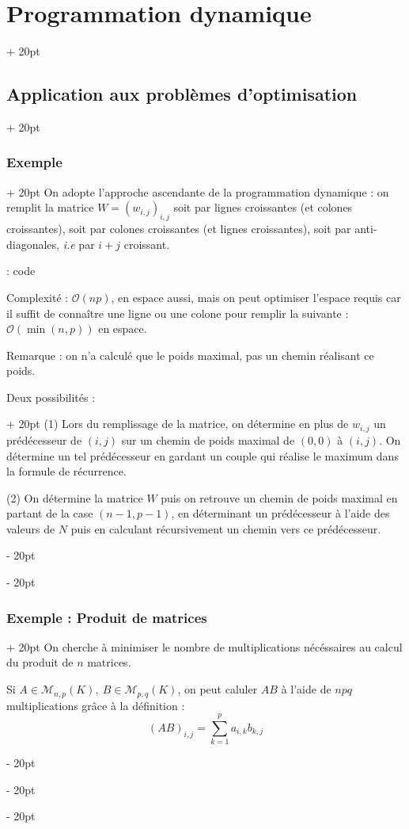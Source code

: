 \documentclass[a4paper, 12pt, twoside]{article}
\newcommand{\ind}[1][20pt]{\advance\leftskip + #1}
\newcommand{\deind}[1][20pt]{\advance\leftskip - #1}
\newenvironment{indt}[2][20pt]{#2 \par \ind[#1]}{\par \deind} %
\begin{document}
\begin{indt}{\section{Programmation dynamique}}
\begin{indt}{\subsection{Application aux problèmes d'optimisation}}
\begin{indt}{\subsubsection{Exemple}}
                On adopte l'approche ascendante de la programmation dynamique : on remplit la matrice $W = (w_{i, j})_{i, j}$ soit par lignes croissantes (et colones croissantes), soit par colones croissantes (et lignes croissantes), soit par anti-diagonales, \textit{i.e} par $i + j$ croissant.
                
                 : code
                
                \vspace{12pt}
                
                Complexité : $\mathcal O(np)$, en espace aussi, mais on peut optimiser l'espace requis car il suffit de connaître une ligne ou une colone pour remplir la suivante : $\mathcal O(\min(n, p))$ en espace.
                
                \vspace{12pt}
                
                Remarque : on n'a calculé que le poids maximal, pas un chemin réalisant ce poids.
                
                \begin{indt}{Deux possibilités :}
                    (1) Lors du remplissage de la matrice, on détermine en plus de $w_{i, j}$ un prédécesseur de $(i, j)$ sur un chemin de poids maximal de $(0, 0)$ à $(i ,j)$. On détermine un tel prédécesseur en gardant un couple qui réalise le maximum dans la formule de récurrence.
                    
                    (2) On détermine la matrice $W$ puis on retrouve un chemin de poids maximal en partant de la case $(n - 1, p - 1)$, en déterminant un prédécesseur à l'aide des valeurs de $N$ puis en calculant récursivement un chemin vers ce prédécesseur.
                \end{indt}
            \end{indt}
            
            \vspace{12pt}
            
            \begin{indt}{\subsubsection{Exemple : Produit de matrices}}
                On cherche à minimiser le nombre de multiplications nécéssaires au calcul du produit de $n$ matrices.
                
                Si $A \in \mathcal M_{n, p}(K),\ B \in \mathcal M_{p, q} (K)$, on peut caluler $AB$ à l'aide de $npq$ multiplications grâce à la définition :
                    \[ (AB)_{i, j} = \sum_{k = 1}^p a_{i,k} b_{k, j} \]
                

\end{indt}
\end{indt}
\end{indt}
\end{document}
